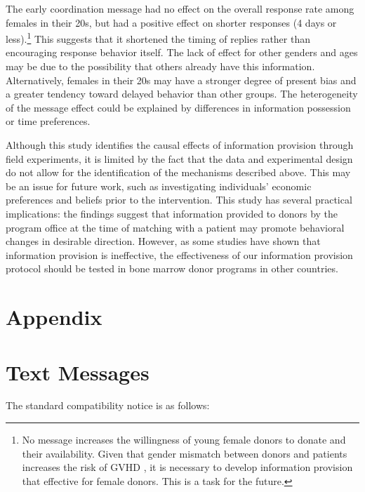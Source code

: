 \documentclass[12pt, a4paper]{article}
\begin{document}
The early coordination message had no effect on the overall response rate among females in their 20s, but had a positive effect on shorter responses (4 days or less).\footnote{No message increases the willingness of young female donors to donate and their availability. Given that gender mismatch between donors and patients increases the risk of GVHD \citep{Loren2006, Nannya2011}, it is necessary to develop information provision that effective for female donors. This is a task for the future.} This suggests that it shortened the timing of replies rather than encouraging response behavior itself. The lack of effect for other genders and ages may be due to the possibility that others already have this information. Alternatively, females in their 20s may have a stronger degree of present bias and a greater tendency toward delayed behavior than other groups. The heterogeneity of the message effect could be explained by differences in information possession or time preferences.

Although this study identifies the causal effects of information provision through field experiments, it is limited by the fact that the data and experimental design do not allow for the identification of the mechanisms described above. This may be an issue for future work, such as investigating individuals' economic preferences and beliefs prior to the intervention. This study has several practical implications: the findings suggest that information provided to donors by the program office at the time of matching with a patient may promote behavioral changes in desirable direction. However, as some studies \citep[for example,][]{Switzer2018} have shown that information provision is ineffective, the effectiveness of our information provision protocol should be tested in bone marrow donor programs in other countries.

\clearpage

\appendix

\hypertarget{appendix}{%
\section*{Appendix}\label{appendix}}

\hypertarget{message}{%
\section{Text Messages}\label{message}}

The standard compatibility notice is as follows:
\end{document}
